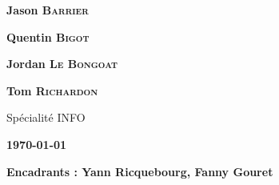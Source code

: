 \pagestyle{empty}
\selectfont


\def\mate#1{\textbf{\color{white}\large #1}}


\hspace{-0.75cm}
\begin{minipage}{21cm}

\noindent {}

\vspace{-27.6cm}
\hspace{12cm}\begin{minipage}{8cm}
\begin{flushright}

\mate{Jason \textsc{Barrier}}

\vspace{3mm}
\mate{Quentin \textsc{Bigot}}

\vspace{3mm}
\mate{Jordan \textsc{Le Bongoat}}

\vspace{3mm}
\mate{Tom \textsc{Richardon}}

\vspace{5mm}
{\color{white}Spécialité INFO}

\vspace{1mm}
\end{flushright}
\end{minipage}
\end{minipage}

\vspace{12.7cm}
\hspace{7cm}\begin{minipage}{11cm}
\noindent \Huge\bfseries \thetitle
	\baselineskip=20pt
    
 
{\Large \bfseries\color{gray} \today}
\begin{minipage}{11cm}
\vspace{2cm}
{\hspace{-3.85cm} \Large \bfseries\color{gray}Encadrants : Yann Ricquebourg, Fanny Gouret}
	
\end{minipage}
\end{minipage}


%

\newpage
\restoregeometry


